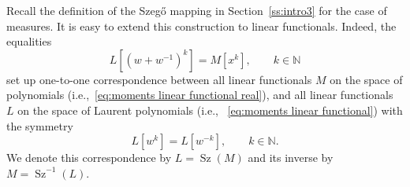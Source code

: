 \documentclass[reqno,centertags,11pt,draft]{amsart}
\newtheorem{prop}[thm]{Proposition}
\newcommand{\R}{\mathbb{R}}
\newcommand{\N}{\mathbb{N}}
\newcommand{\T}{\mathbb{\partial\mathbb{D}}}
\begin{document}

Recall the definition of the Szeg\H{o} mapping in Section~\ref{ss:intro3} for the case of measures. It is easy to extend this construction to linear functionals. Indeed, the equalities
\begin{equation}
    \label{eq:SzegoMapFunctionals}
    L[(w+w^{-1})^k] = M[x^k], \qquad k\in\N
\end{equation}
set up one-to-one correspondence between all linear functionals $M$ on the space of polynomials (i.e.,~\eqref{eq:moments linear functional real}), and all linear functionals $L$ on the space of Laurent polynomials (i.e., ~\eqref{eq:moments linear functional}) with the symmetry
\begin{equation}\label{eq:symmetricFunctionals}
    L[w^k]=L[w^{-k}], \qquad k\in\N.
\end{equation}
We denote this correspondence by $L = \operatorname{Sz}(M)$ and its inverse by $M = \operatorname{Sz}^{-1}(L)$.




\end{document}
